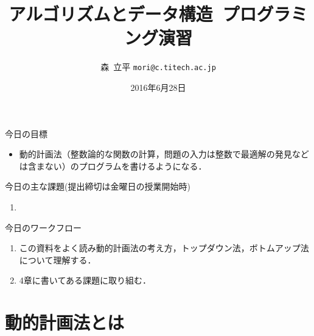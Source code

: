 \documentclass[a4paper,twoside,onecolumn,openany,article]{memoir}
\title{アルゴリズムとデータ構造~プログラミング演習}
\date{2016年6月28日}
\author{森~立平 \texttt{mori@c.titech.ac.jp}}
\theoremstyle{remark}
\begin{document}
\maketitle

\noindent
今日の目標
\begin{itemize}
\item 動的計画法（整数論的な関数の計算，問題の入力は整数で最適解の発見などは含まない）のプログラムを書けるようになる．
\end{itemize}

\noindent
今日の主な課題(提出締切は金曜日の授業開始時)
\begin{enumerate}
\item 
\end{enumerate}

\noindent
今日のワークフロー
\begin{enumerate}
\item この資料をよく読み動的計画法の考え方，トップダウン法，ボトムアップ法について理解する．
\item 4章に書いてある課題に取り組む．
\end{enumerate}

\section{動的計画法とは}
\end{document}
